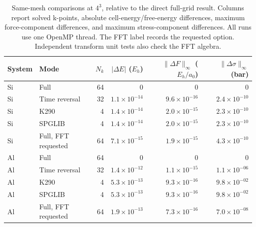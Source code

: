 \begin{table}[htbp]
\centering\small\setlength{\tabcolsep}{4pt}
\caption{Same-mesh comparisons at $4^3$, relative to the direct full-grid result. Columns report solved k-points, absolute cell-energy/free-energy differences, maximum force-component differences, and maximum stress-component differences. All runs use one OpenMP thread. The FFT label records the requested option. Independent transform unit tests also check the FFT algebra.}
\label{tab:symmetry-validation}
\begin{tabular}{llrrrr}
\toprule
System & Mode & $N_k$ & $|\Delta E|$ ($E_h$) & $\|\Delta F\|_\infty$ ($E_h/a_0$) & $\|\Delta\sigma\|_\infty$ (bar) \\
\midrule
Si & Full & 64 & $0$ & $0$ & $0$ \\
Si & Time reversal & 32 & $1.1\times10^{-14}$ & $9.6\times10^{-16}$ & $2.4\times10^{-10}$ \\
Si & K290 & 4 & $1.4\times10^{-14}$ & $2.0\times10^{-15}$ & $2.3\times10^{-10}$ \\
Si & SPGLIB & 4 & $1.4\times10^{-14}$ & $2.0\times10^{-15}$ & $2.3\times10^{-10}$ \\
Si & Full, FFT requested & 64 & $7.1\times10^{-15}$ & $1.9\times10^{-15}$ & $4.3\times10^{-10}$ \\
Al & Full & 64 & $0$ & $0$ & $0$ \\
Al & Time reversal & 32 & $1.4\times10^{-12}$ & $1.1\times10^{-15}$ & $1.1\times10^{-06}$ \\
Al & K290 & 4 & $5.3\times10^{-13}$ & $9.3\times10^{-16}$ & $9.8\times10^{-02}$ \\
Al & SPGLIB & 4 & $5.3\times10^{-13}$ & $9.3\times10^{-16}$ & $9.8\times10^{-02}$ \\
Al & Full, FFT requested & 64 & $1.9\times10^{-13}$ & $7.3\times10^{-16}$ & $7.0\times10^{-08}$ \\
\bottomrule
\end{tabular}
\end{table}
